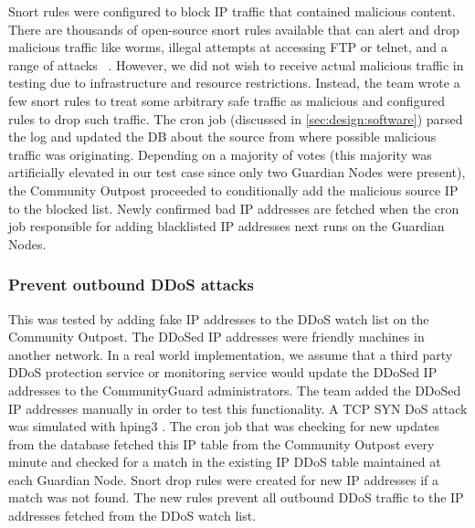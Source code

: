  Snort rules were configured to block IP traffic that contained malicious content. There are thousands of open-source snort rules available that can alert and drop malicious traffic like worms, illegal attempts at accessing FTP or telnet, and a range of attacks ~\cite{Roesch:1999:SLI:1039834.1039864}. However, we did not wish to receive actual malicious traffic in testing due to infrastructure and resource restrictions. Instead, the team wrote a few snort rules to treat some arbitrary safe traffic as malicious and configured rules to drop such traffic. 
The cron job (discussed in \ref{sec:design:software}) parsed the log and updated the DB about the source from where possible malicious traffic was originating. Depending on a majority of votes (this majority was artificially elevated in our test case since only two Guardian Nodes were present), the Community Outpost proceeded to conditionally add the malicious source IP to the blocked list. Newly confirmed bad IP addresses are fetched when the cron job responsible for adding blacklisted IP addresses next runs on the Guardian Nodes. %

\subsubsection{Prevent outbound DDoS attacks}
\label{sec:eval:outddos}

This was tested by adding fake IP addresses to the DDoS watch list on the Community Outpost. The DDoSed IP addresses were friendly machines in another network. In a real world implementation, we assume that a third party DDoS protection service \cite{DDoSPreventionTools} or monitoring service would update the DDoSed IP addresses to the CommunityGuard administrators. The team added the DDoSed IP addresses manually in order to test this functionality. A TCP SYN DoS attack was simulated with hping3 \cite{hpingReferralPaper} \cite{hping}.  The cron job that was checking for new updates from the database fetched this IP table from the Community Outpost every minute and checked for a match in the existing IP DDoS table maintained at each Guardian Node. Snort drop rules were created for new IP addresses if a match was not found. The new rules prevent all outbound DDoS traffic to the IP addresses fetched from the DDoS watch list. 

